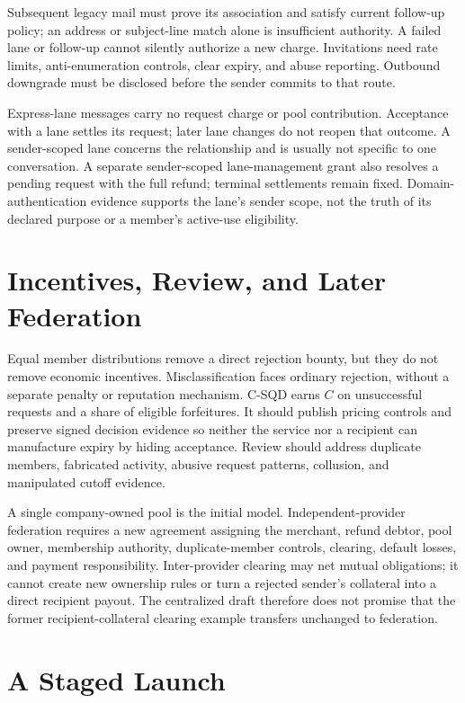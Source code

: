 \documentclass[11pt]{article}
\begin{document}
Subsequent legacy mail must prove its association and satisfy current follow-up
policy; an address or subject-line match alone is insufficient authority. A
failed lane or follow-up cannot silently authorize a new charge. Invitations
need rate limits, anti-enumeration controls, clear expiry, and abuse reporting.
Outbound downgrade must be disclosed before the sender commits to that route.

Express-lane messages carry no request charge or pool contribution. Acceptance
with a lane settles its request; later lane changes do not reopen that outcome.
A sender-scoped lane concerns the relationship and is usually not specific to
one conversation. A separate sender-scoped lane-management grant also resolves a
pending request with the full refund; terminal settlements remain fixed. Domain-authentication evidence
supports the lane's sender scope, not the truth of its declared purpose or a
member's active-use eligibility.

\section{Incentives, Review, and Later Federation}

Equal member distributions remove a direct rejection bounty, but they do not
remove economic incentives. Misclassification faces ordinary rejection, without
a separate penalty or reputation mechanism. C-SQD earns $C$ on unsuccessful requests and a share
of eligible forfeitures. It should publish pricing controls and preserve signed
decision evidence so neither the service nor a recipient can manufacture expiry
by hiding acceptance. Review should address duplicate members, fabricated
activity, abusive request patterns, collusion, and manipulated cutoff evidence.

A single company-owned pool is the initial model. Independent-provider federation
requires a new agreement assigning the merchant, refund debtor, pool owner,
membership authority, duplicate-member controls, clearing, default losses, and
payment responsibility. Inter-provider clearing may net mutual obligations;
it cannot create new ownership rules or turn a rejected sender's collateral into
a direct recipient payout. The centralized draft therefore does not promise that
the former recipient-collateral clearing example transfers unchanged to federation.

\section{A Staged Launch}
\end{document}
